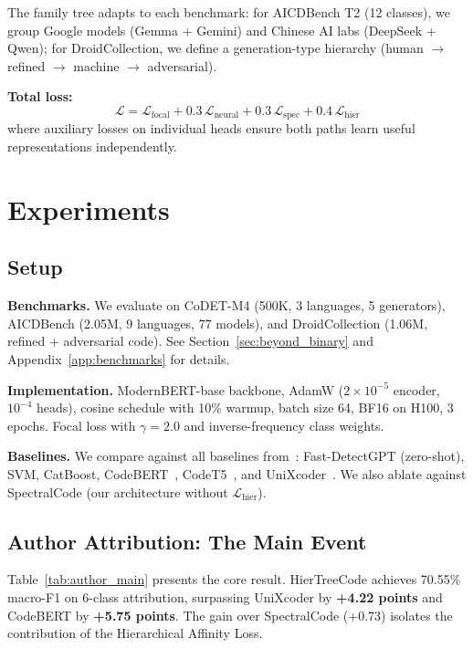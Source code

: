\documentclass{article}
\begin{document}
The family tree adapts to each benchmark: for AICDBench T2 (12 classes), we group Google models (Gemma + Gemini) and Chinese AI labs (DeepSeek + Qwen); for DroidCollection, we define a generation-type hierarchy (human $\to$ refined $\to$ machine $\to$ adversarial).

\textbf{Total loss:}
\begin{equation}
\mathcal{L} = \mathcal{L}_{\text{focal}} + 0.3\,\mathcal{L}_{\text{neural}} + 0.3\,\mathcal{L}_{\text{spec}} + 0.4\,\mathcal{L}_{\text{hier}}
\end{equation}
where auxiliary losses on individual heads ensure both paths learn useful representations independently.


\section{Experiments}
\label{sec:experiments}

\subsection{Setup}

\textbf{Benchmarks.} We evaluate on CoDET-M4 (500K, 3 languages, 5 generators), AICDBench (2.05M, 9 languages, 77 models), and DroidCollection (1.06M, refined + adversarial code). See Section~\ref{sec:beyond_binary} and Appendix~\ref{app:benchmarks} for details.

\textbf{Implementation.} ModernBERT-base backbone, AdamW ($2\!\times\!10^{-5}$ encoder, $10^{-4}$ heads), cosine schedule with 10\% warmup, batch size 64, BF16 on H100, 3 epochs. Focal loss with $\gamma\!=\!2.0$ and inverse-frequency class weights.

\textbf{Baselines.} We compare against all baselines from~\citet{orel2025codet}: Fast-DetectGPT (zero-shot), SVM, CatBoost, CodeBERT~\citep{feng2020codebert}, CodeT5~\citep{wang2021codet5}, and UniXcoder~\citep{guo2022unixcoder}. We also ablate against SpectralCode (our architecture without $\mathcal{L}_{\text{hier}}$).


\subsection{Author Attribution: The Main Event}

Table~\ref{tab:author_main} presents the core result. HierTreeCode achieves 70.55\% macro-F1 on 6-class attribution, surpassing UniXcoder by \textbf{+4.22 points} and CodeBERT by \textbf{+5.75 points}. The gain over SpectralCode (+0.73) isolates the contribution of the Hierarchical Affinity Loss.
\end{document}
